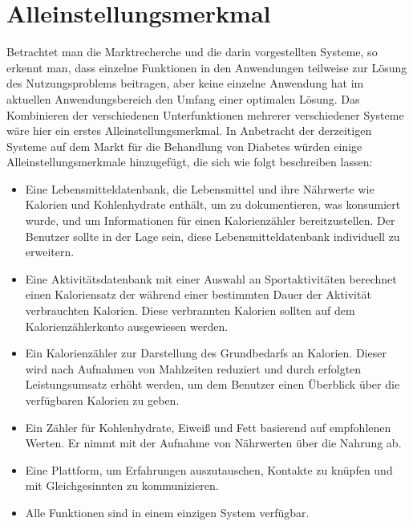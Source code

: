 \section{Alleinstellungsmerkmal}
	Betrachtet man die Marktrecherche und die darin vorgestellten Systeme, so erkennt man, dass einzelne Funktionen in den Anwendungen teilweise zur Lösung des Nutzungsproblems beitragen, aber keine einzelne Anwendung hat im aktuellen Anwendungsbereich den Umfang einer optimalen Lösung. Das Kombinieren der verschiedenen Unterfunktionen mehrerer verschiedener Systeme wäre hier ein erstes Alleinstellungsmerkmal.\newline
	In Anbetracht der derzeitigen Systeme auf dem Markt für die Behandlung von Diabetes würden einige Alleinstellungsmerkmale hinzugefügt, die sich wie folgt beschreiben lassen:
	\begin{itemize}
	\item Eine Lebensmitteldatenbank, die Lebensmittel und ihre Nährwerte wie Kalorien und Kohlenhydrate enthält, um zu dokumentieren, was konsumiert wurde, und um Informationen für einen Kalorienzähler bereitzustellen. Der Benutzer sollte in der Lage sein, diese Lebensmitteldatenbank individuell zu erweitern. 
	\item Eine Aktivitätsdatenbank mit einer Auswahl an Sportaktivitäten berechnet einen Kaloriensatz der während einer bestimmten Dauer der Aktivität verbrauchten Kalorien. Diese verbrannten Kalorien sollten auf dem Kalorienzählerkonto ausgewiesen werden.
	\item Ein Kalorienzähler zur Darstellung des Grundbedarfs an Kalorien. Dieser wird nach Aufnahmen von Mahlzeiten reduziert und durch erfolgten Leistungsumsatz erhöht werden, um dem Benutzer einen Überblick über die verfügbaren Kalorien zu geben.
	\item Ein Zähler für Kohlenhydrate, Eiweiß und Fett basierend auf empfohlenen Werten. Er nimmt mit der Aufnahme von Nährwerten über die Nahrung ab. 
	\item Eine Plattform, um Erfahrungen auszutauschen, Kontakte zu knüpfen und mit Gleichgesinnten zu kommunizieren. 
	\item Alle Funktionen sind in einem einzigen System verfügbar.
	\end{itemize}